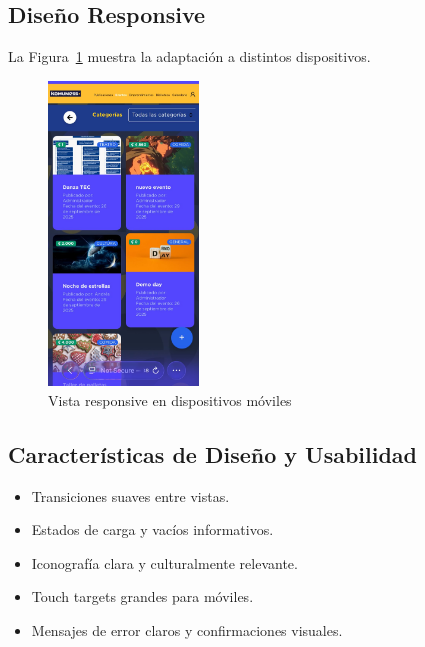 \subsection{Diseño Responsive}

La Figura~\ref{fig:responsive} muestra la adaptación a distintos dispositivos.

\begin{figure}[H]
  \centering
  \includegraphics[width=4cm,keepaspectratio]{project/images/imagen8.jpg}
  


  \caption{Vista responsive en dispositivos móviles}
  \label{fig:responsive}
\end{figure}


\subsection{Características de Diseño y Usabilidad}

\begin{itemize}
  \item Transiciones suaves entre vistas.
  \item Estados de carga y vacíos informativos.
  \item Iconografía clara y culturalmente relevante.
  \item Touch targets grandes para móviles.
  \item Mensajes de error claros y confirmaciones visuales.
\end{itemize}
